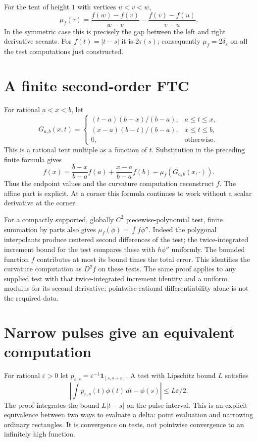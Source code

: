 For the tent of height $1$ with vertices $u<v<w$,
\[
 \mu_f(\tau)=\frac{f(w)-f(v)}{w-v}
                  -\frac{f(v)-f(u)}{v-u}.
\]
In the symmetric case this is precisely the gap between the left and right
derivative secants.  For $f(t)=|t-s|$ it is $2\tau(s)$; consequently
$\mu_f=2\delta_s$ on all the test computations just constructed.

\section{A finite second-order FTC}
For rational $a<x<b$, let
\[
 G_{a,b}(x,t)=
 \begin{cases}
 (t-a)(b-x)/(b-a),&a\le t\le x,\\
 (x-a)(b-t)/(b-a),&x\le t\le b,\\
 0,&\text{otherwise}.
 \end{cases}
\]
This is a rational tent multiple as a function of $t$.  Substitution in
the preceding finite formula gives
\[
 \boxed{f(x)=\frac{b-x}{b-a}f(a)+\frac{x-a}{b-a}f(b)
                -\mu_f(G_{a,b}(x,\cdot)).}
\]
Thus the endpoint values and the curvature computation reconstruct $f$.
The affine part is explicit.  At a corner this formula continues to work
without a scalar derivative at the corner.

For a compactly supported, globally $C^2$ piecewise-polynomial test,
finite summation by parts also gives
$\mu_f(\phi)=\int f\phi''$.  Indeed the polygonal interpolants produce
centered second differences of the test; the twice-integrated increment
bound for the test compares these with $h\phi''$ uniformly.  The bounded
function $f$ contributes at most its bound times the total error.
This identifies the curvature computation as $D^2f$ on these tests.
The same proof applies to any supplied test with that twice-integrated
increment identity and a uniform modulus for its second derivative;
pointwise rational differentiability alone is not the required data.

\section{Narrow pulses give an equivalent computation}
For rational $\varepsilon>0$ let
$p_{\varepsilon,s}=\varepsilon^{-1}\mathbf1_{[s,s+\varepsilon]}$.
A test with Lipschitz bound $L$ satisfies
\[
 \left|\int p_{\varepsilon,s}(t)\phi(t)\,dt-\phi(s)\right|
       \le L\varepsilon/2.
\]
The proof integrates the bound $L|t-s|$ on the pulse interval.  This is an
explicit equivalence between two ways to evaluate a delta: point evaluation
and narrowing ordinary rectangles.  It is convergence on tests, not
pointwise convergence to an infinitely high function.
